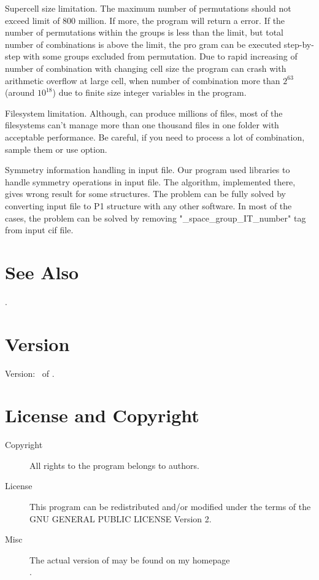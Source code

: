 \documentclass[a4paper,english]{article}
\begin{document}
\begin{Description}\setlength{\itemsep}{0cm}
\item[Supercell size limitation.]
The maximum number of permutations should not exceed limit of 800 million. If more, the program will return a error. If the number of permutations within the groups is less than the limit, but total number of combinations is above the limit, the pro gram can be executed step-by-step with some groups excluded from permutation. Due to rapid increasing of number of combination with changing cell size the program can crash with arithmetic overflow at large cell, when number of combination more than $2^{63}$ (around $10^{18}$) due to finite size integer variables in the program.
\item[Filesystem limitation.]
Although,  can produce millions of files, most of the filesystems can't manage more than one thousand files in one folder with acceptable performance. Be careful, if you need to process a lot of combination, sample them or use  option.
\item[Symmetry information handling in input file.]
Our program used  libraries to handle symmetry operations in input file. The algorithm, implemented there, gives wrong result for some structures. The problem can be fully solved by converting input file to P1 structure with any other software. In most of the cases, the problem can be solved by removing "\_space\_group\_IT\_number" tag from input cif file.

\end{Description}

\section{See Also}

.


\section{Version}

Version: \Version\ of \Date.

\section{License and Copyright}

\begin{description}
\item[Copyright] 
     All rights to the program belongs to authors.

\item[License] This program can be redistributed and/or modified under the
     terms of the GNU GENERAL PUBLIC LICENSE Version 2.

\item[Misc]
     The actual version of   may be found on my homepage\\
     .

\end{description}
\end{document}
